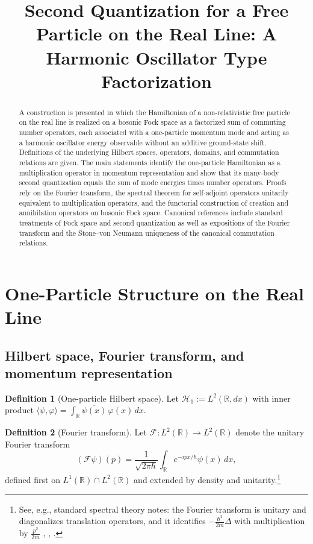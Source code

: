 \documentclass[11pt]{article}
\title{Second Quantization for a Free Particle on the Real Line: A Harmonic Oscillator Type Factorization}
\author{}
\date{}
\theoremstyle{definition}
\newtheorem{definition}{Definition}
\theoremstyle{plain}
\numberwithin{equation}{section}
\begin{document}
\maketitle

\begin{abstract}
A construction is presented in which the Hamiltonian of a non-relativistic free particle on the real line is realized on a bosonic Fock space as a factorized sum of commuting number operators, each associated with a one-particle momentum mode and acting as a harmonic oscillator energy observable without an additive ground-state shift. Definitions of the underlying Hilbert spaces, operators, domains, and commutation relations are given. The main statements identify the one-particle Hamiltonian as a multiplication operator in momentum representation and show that its many-body second quantization equals the sum of mode energies times number operators. Proofs rely on the Fourier transform, the spectral theorem for self-adjoint operators unitarily equivalent to multiplication operators, and the functorial construction of creation and annihilation operators on bosonic Fock space. Canonical references include standard treatments of Fock space and second quantization as well as expositions of the Fourier transform and the Stone--von Neumann uniqueness of the canonical commutation relations.
\end{abstract}

\tableofcontents

\section{One-Particle Structure on the Real Line}

\subsection{Hilbert space, Fourier transform, and momentum representation}

\begin{definition}[One-particle Hilbert space]
Let $\mathcal{H}_1 := L^2(\mathbb{R},dx)$ with inner product $\langle \psi,\varphi\rangle=\int_{\mathbb{R}}\overline{\psi(x)}\,\varphi(x)\,dx$.
\end{definition}

\begin{definition}[Fourier transform]
Let $\mathcal{F}:L^2(\mathbb{R})\to L^2(\mathbb{R})$ denote the unitary Fourier transform
\[
(\mathcal{F}\psi)(p)=\frac{1}{\sqrt{2\pi\hbar}}\int_{\mathbb{R}}e^{-ipx/\hbar}\psi(x)\,dx,
\]
defined first on $L^1(\mathbb{R})\cap L^2(\mathbb{R})$ and extended by density and unitarity.\footnote{See, e.g., standard spectral theory notes: the Fourier transform is unitary and diagonalizes translation operators, and it identifies $-\frac{\hbar^2}{2m}\Delta$ with multiplication by $\frac{p^2}{2m}$ \cite[Thm.~10]{harvardfourier}, \cite[Sec.~1.6]{kowalskispectral}, \cite[Sec.~2]{feldmanlaplacian}.}
\]
\end{definition}
\end{document}
